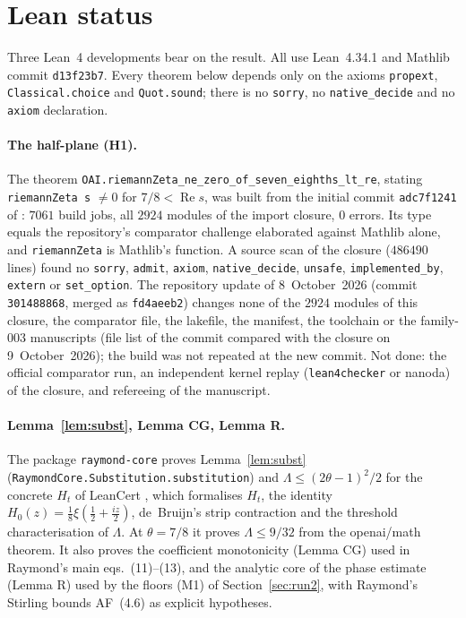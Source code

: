 \documentclass[11pt]{article}
\theoremstyle{definition}
\newcommand{\LB}{\Lambda}
\DeclareMathOperator{\Rea}{Re}
\begin{document}
\section{Lean status}\label{sec:lean}

Three Lean~4 \cite{Lean4} developments bear on the result. All use Lean~4.34.1 and Mathlib
\cite{Mathlib20} commit \texttt{d13f23b7}. Every theorem below depends only on the axioms
\texttt{propext}, \texttt{Classical.choice} and \texttt{Quot.sound}; there is no
\texttt{sorry}, no \texttt{native\_decide} and no \texttt{axiom} declaration.

\paragraph{The half-plane (H1).} The theorem
\texttt{OAI.riemannZeta\_ne\_zero\_of\_seven\_eighths\_lt\_re}, stating
\texttt{riemannZeta s} $\ne0$ for $7/8<\Rea s$, was built from the initial commit
\texttt{adc7f1241} of \cite{OpenAI26QRH}: $7061$ build jobs, all $2924$ modules of the import
closure, $0$ errors. Its type equals the repository's comparator challenge elaborated against
Mathlib alone, and \texttt{riemannZeta} is Mathlib's function. A source scan of the closure
($486490$ lines) found no \texttt{sorry}, \texttt{admit}, \texttt{axiom},
\texttt{native\_decide}, \texttt{unsafe}, \texttt{implemented\_by}, \texttt{extern} or
\texttt{set\_option}. The repository update of 8~October~2026 (commit \texttt{301488868},
merged as \texttt{fd4aeeb2}) changes none of the $2924$ modules of this closure, the comparator
file, the lakefile, the manifest, the toolchain or the family-003 manuscripts (file list of the
commit compared with the closure on 9~October~2026); the build was not repeated at the new
commit. Not done: the official comparator run, an independent kernel replay
(\texttt{lean4checker} or nanoda) of the closure, and refereeing of the manuscript.

\paragraph{Lemma~\ref{lem:subst}, Lemma CG, Lemma R.} The package \texttt{raymond-core}
proves Lemma~\ref{lem:subst} (\texttt{RaymondCore.Substitution.substitution}) and
$\LB\le(2\theta-1)^2/2$ for the concrete $H_t$ of LeanCert \cite{LeanCert}, which formalises
$H_t$, the identity $H_0(z)=\frac18\xi(\frac12+\frac{iz}2)$, de~Bruijn's strip contraction
and the threshold characterisation of $\LB$. At $\theta=7/8$ it proves $\LB\le9/32$ from the
openai/math theorem. It also proves the coefficient monotonicity (Lemma CG) used in
Raymond's main eqs.~(11)--(13), and the analytic core of the phase estimate (Lemma R) used
by the floors (M1) of Section~\ref{sec:run2}, with Raymond's Stirling bounds AF~(4.6) as
explicit hypotheses.
\end{document}
